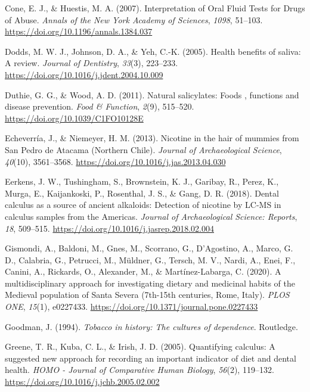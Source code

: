 \documentclass[
]{article}
\newlength{\cslhangindent}
\newenvironment{CSLReferences}[2] %
 {\begin{list}{}{%
  \setlength{\itemindent}{0pt}
  \setlength{\leftmargin}{0pt}
  \setlength{\parsep}{0pt}
  \ifodd #1
   \setlength{\leftmargin}{\cslhangindent}
   \setlength{\itemindent}{-1\cslhangindent}
  \fi
  \setlength{\itemsep}{#2\baselineskip}}}
 {\end{list}}
\begin{document}
\begin{CSLReferences}{1}{0}
Cone, E. J., \& Huestis, M. A. (2007). Interpretation of {Oral Fluid
Tests} for {Drugs} of {Abuse}. \emph{Annals of the New York Academy of
Sciences}, \emph{1098}, 51--103.
\url{https://doi.org/10.1196/annals.1384.037}

Dodds, M. W. J., Johnson, D. A., \& Yeh, C.-K. (2005). Health benefits
of saliva: A review. \emph{Journal of Dentistry}, \emph{33}(3),
223--233. \url{https://doi.org/10.1016/j.jdent.2004.10.009}

Duthie, G. G., \& Wood, A. D. (2011). Natural salicylates: Foods ,
functions and disease prevention. \emph{Food \& Function}, \emph{2}(9),
515--520. \url{https://doi.org/10.1039/C1FO10128E}

Echeverría, J., \& Niemeyer, H. M. (2013). Nicotine in the hair of
mummies from {San Pedro} de {Atacama} ({Northern Chile}). \emph{Journal
of Archaeological Science}, \emph{40}(10), 3561--3568.
\url{https://doi.org/10.1016/j.jas.2013.04.030}

Eerkens, J. W., Tushingham, S., Brownstein, K. J., Garibay, R., Perez,
K., Murga, E., Kaijankoski, P., Rosenthal, J. S., \& Gang, D. R. (2018).
Dental calculus as a source of ancient alkaloids: {Detection} of
nicotine by {LC-MS} in calculus samples from the {Americas}.
\emph{Journal of Archaeological Science: Reports}, \emph{18}, 509--515.
\url{https://doi.org/10.1016/j.jasrep.2018.02.004}

Gismondi, A., Baldoni, M., Gnes, M., Scorrano, G., D'Agostino, A.,
Marco, G. D., Calabria, G., Petrucci, M., Müldner, G., Tersch, M. V.,
Nardi, A., Enei, F., Canini, A., Rickards, O., Alexander, M., \&
Martínez-Labarga, C. (2020). A multidisciplinary approach for
investigating dietary and medicinal habits of the {Medieval} population
of {Santa Severa} (7th-15th centuries, {Rome}, {Italy}). \emph{PLOS
ONE}, \emph{15}(1), e0227433.
\url{https://doi.org/10.1371/journal.pone.0227433}

Goodman, J. (1994). \emph{Tobacco in history: The cultures of
dependence}. {Routledge}.

Greene, T. R., Kuba, C. L., \& Irish, J. D. (2005). Quantifying
calculus: {A} suggested new approach for recording an important
indicator of diet and dental health. \emph{HOMO - Journal of Comparative
Human Biology}, \emph{56}(2), 119--132.
\url{https://doi.org/10.1016/j.jchb.2005.02.002}


\end{CSLReferences}
\end{document}
